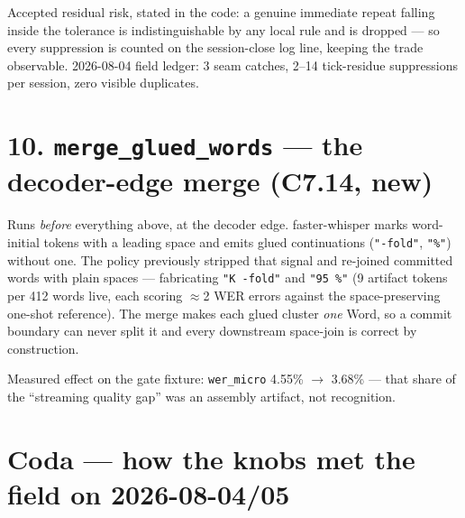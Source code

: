 \documentclass[11pt]{article}
\newcommand{\panelrow}[1]{\node[rowlbl] at (-0.2,0.25) {#1};}
\begin{document}
Accepted residual risk, stated in the code: a genuine immediate repeat falling
inside the tolerance is indistinguishable by any local rule and is dropped ---
so every suppression is counted on the session-close log line, keeping the
trade observable. 2026-08-04 field ledger: 3 seam catches, 2--14 tick-residue
suppressions per session, zero visible duplicates.

\section*{10. \texttt{merge\_glued\_words} --- the decoder-edge merge (C7.14, new)}

Runs \emph{before} everything above, at the decoder edge. faster-whisper marks
word-initial tokens with a leading space and emits glued continuations
(\texttt{"-fold"}, \texttt{"\%"}) without one. The policy previously stripped
that signal and re-joined committed words with plain spaces --- fabricating
\texttt{"K -fold"} and \texttt{"95 \%"} (9 artifact tokens per 412 words live,
each scoring $\approx$2 WER errors against the space-preserving one-shot
reference). The merge makes each glued cluster \emph{one} Word, so a commit
boundary can never split it and every downstream space-join is correct by
construction.

\begin{center}
\end{center}

Measured effect on the gate fixture: \texttt{wer\_micro} 4.55\% $\rightarrow$
3.68\% --- that share of the ``streaming quality gap'' was an assembly
artifact, not recognition.

\section*{Coda --- how the knobs met the field on 2026-08-04/05}
\end{document}
